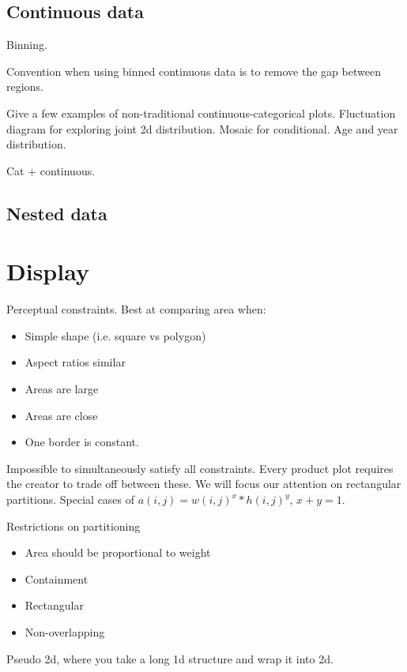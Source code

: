 \documentclass[letterpaper,oneside]{scrartcl}
\begin{document}
\subsection{Continuous data}
\label{sub:continuous_data}

Binning. 

Convention when using binned continuous data is to remove the gap between regions.

Give a few examples of non-traditional continuous-categorical plots.  Fluctuation diagram for exploring joint 2d distribution.  Mosaic for conditional.  Age and year distribution.  

Cat + continuous.

\subsection{Nested data}
\label{sub:nested_data}

\section{Display}
\label{sec:display}

Perceptual constraints.  Best at comparing area when:

\begin{itemize}
  \item Simple shape (i.e. square vs polygon)
  \item Aspect ratios similar
  \item Areas are large
  \item Areas are close
  \item One border is constant.
\end{itemize}

Impossible to simultaneously satisfy all constraints.  Every product plot requires the creator to trade off between these.  We will focus our attention on rectangular partitions.  Special cases of $a(i, j) = w(i, j)^x * h(i, j)^y$,   $x + y = 1$.

Restrictions on partitioning

\begin{itemize}
  \item Area should be proportional to weight
  \item Containment
  \item Rectangular
  \item Non-overlapping
\end{itemize}

Pseudo 2d, where you take a long 1d structure and wrap it into 2d.
\end{document}

